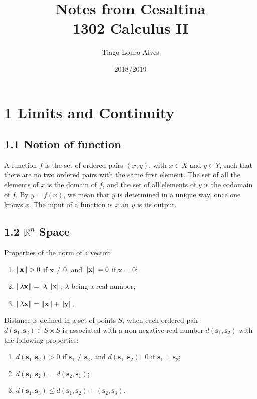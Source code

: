 \documentclass[0pt, a4paper]{article}
\title{%
  Notes from Cesaltina\\
  \large 1302 Calculus II}
\date{2018/2019}
\author{Tiago Louro Alves}
\begin{document}
\maketitle
{}
\thispagestyle{empty}
\newpage

{\small\tableofcontents}

\clearpage

\section*{1 Limits and Continuity}

\subsection*{1.1 Notion of function}

A function $f$ is the set of ordered pairs $(x,y)$, with $x\in X$ and $y\in Y$, such that there are no two ordered pairs with the same first element. The set of all the elements of $x$ is the domain of $f$, and the set of all elements of $y$ is the codomain of $f$. By $y=f(x)$, we mean that $y$ is determined in a unique way, once one knows $x$. The input of a function is $x$ an $y$ is its output.

\subsection*{1.2 $\mathbb{R}^n$ Space}

Properties of the norm of a vector:
\begin{enumerate}
	\item $\norm{\textbf{x}}>0$ if $\textbf{x}\neq0$, and $\norm{\textbf{x}}=0$ if $\textbf{x}=0$; 
	\item $\norm{\lambda \textbf{x}} = \abs{\lambda}\norm{\textbf{x}}$, $\lambda$ being a real number;
	\item $\norm{\lambda \textbf{x}} = \norm{\textbf{x}}+\norm{\textbf{y}}$.
\end{enumerate}	

Distance is defined in a set of points $S$, when each ordered pair $d(\textbf{s}_1, \textbf{s}_2) \in S \times S$ is associated with a non-negative real number $d(\textbf{s}_1, \textbf{s}_2)$ with the following properties:
\begin{enumerate}
	\item $d(\textbf{s}_1, \textbf{s}_2)>0$ if $\textbf{s}_1 \neq \textbf{s}_2$, and $d(\textbf{s}_1, \textbf{s}_2)$=0 if $\textbf{s}_1= \textbf{s}_2$;
	\item $d(\textbf{s}_1, \textbf{s}_2)=d(\textbf{s}_2, \textbf{s}_1)$;
	\item $d(\textbf{s}_1, \textbf{s}_3) \leq d(\textbf{s}_1, \textbf{s}_2)+ (\textbf{s}_2, \textbf{s}_3)$.
\end{enumerate}	
\end{document}
